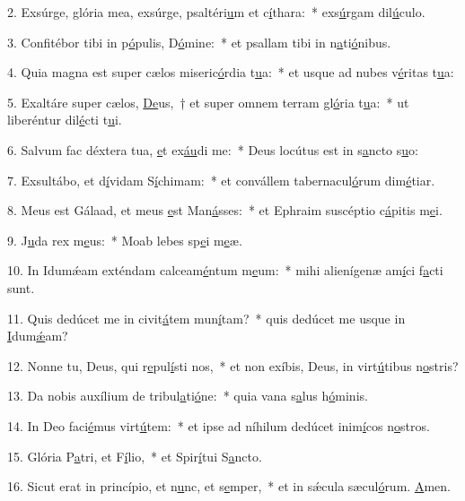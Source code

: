 2. Exsúrge, glória mea, exsúrge, psaltéri\uline{u}m et c\uline{í}thara:~* exs\uline{ú}rgam dil\uline{ú}culo.\par 
3. Confitébor tibi in p\uline{ó}pulis, D\uline{ó}mine:~* et psallam tibi in n\uline{a}ti\uline{ó}nibus.\par 
4. Quia magna est super cælos miseric\uline{ó}rdia t\uline{u}a:~* et usque ad nubes v\uline{é}ritas t\uline{u}a:\par 
5. Exaltáre super cælos, \uline{De}us,~† et super omnem terram gl\uline{ó}ria t\uline{u}a:~* ut liberéntur dil\uline{é}cti t\uline{u}i.\par 
6. Salvum fac déxtera tua, \uline{e}t ex\uline{áu}di me:~* Deus locútus est in s\uline{a}ncto s\uline{u}o:\par 
7. Exsultábo, et d\uline{í}vidam S\uline{í}chimam:~* et convállem tabernacul\uline{ó}rum dim\uline{é}tiar.\par 
8. Meus est Gálaad, et meus \uline{e}st Man\uline{á}sses:~* et Ephraim suscéptio c\uline{á}pitis m\uline{e}i.\par 
9. J\uline{u}da rex m\uline{e}us:~* Moab lebes sp\uline{e}i m\uline{e}æ.\par 
10. In Idumǽam exténdam calceam\uline{é}ntum m\uline{e}um:~* mihi alienígenæ am\uline{í}ci f\uline{a}cti sunt.\par 
11. Quis dedúcet me in civit\uline{á}tem mun\uline{í}tam?~* quis dedúcet me usque in \uline{I}dum\uline{ǽ}am?\par 
12. Nonne tu, Deus, qui r\uline{e}pul\uline{í}sti nos,~* et non exíbis, Deus, in virt\uline{ú}tibus n\uline{o}stris?\par 
13. Da nobis auxílium de tribul\uline{a}ti\uline{ó}ne:~* quia vana s\uline{a}lus h\uline{ó}minis.\par 
14. In Deo faci\uline{é}mus virt\uline{ú}tem:~* et ipse ad níhilum dedúcet inim\uline{í}cos n\uline{o}stros.\par 
15. Glória P\uline{a}tri, et F\uline{í}lio,~* et Spir\uline{í}tui S\uline{a}ncto.\par 
16. Sicut erat in princípio, et n\uline{u}nc, et s\uline{e}mper,~* et in sǽcula sæcul\uline{ó}rum. \uline{A}men.\par 
